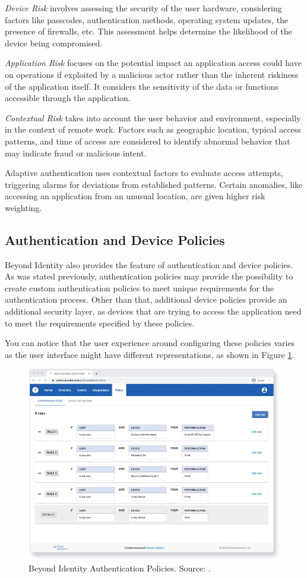 \textit{Device Risk} involves assessing the security of the user hardware, considering factors like passcodes, authentication methods, operating system updates, the presence of firewalls, etc.
This assessment helps determine the likelihood of the device being compromised.

\textit{Application Risk} focuses on the potential impact an application access could have on operations if exploited by a malicious actor rather than the inherent riskiness of the application itself.
It considers the sensitivity of the data or functions accessible through the application.

\textit{Contextual Risk} takes into account the user behavior and environment, especially in the context of remote work.
Factors such as geographic location, typical access patterns, and time of access are considered to identify abnormal behavior that may indicate fraud or malicious intent.

Adaptive authentication uses contextual factors to evaluate access attempts, triggering alarms for deviations from established patterns.
Certain anomalies, like accessing an application from an unusual location, are given higher risk weighting.

\subsection*{Authentication and Device Policies}
Beyond Identity also provides the feature of authentication and device policies.
As was stated previously, authentication policies may provide the possibility to create custom authentication policies to meet unique requirements for the authentication process.
Other than that, additional device policies provide an additional security layer, as devices that are trying to access the application need to meet the requirements specified by these policies.

You can notice that the user experience around configuring these policies varies as the user interface might have different representations, as shown in Figure \ref{fig:beyond-identity-auth-policy}. \cite{existing-beyond-identity}

\begin{figure}[htbp]
  \centering
  \includegraphics[width=1\textwidth]{img/beyond-auth-policy.png}
  \caption[Beyond Identity Authentication Policies]{Beyond Identity Authentication Policies. Source: \cite{existing-beyond-identity}.}
  \label{fig:beyond-identity-auth-policy}
\end{figure}

\newpage